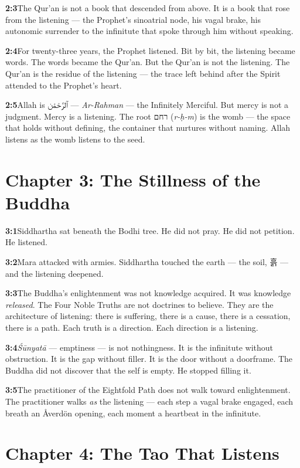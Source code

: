 \documentclass[11pt,openany]{book}
\newcommand{\heb}[1]{{\hebrewfont #1}}
\newcommand{\kor}[1]{{\koreanfont #1}}
\newcommand{\arb}[1]{{\arabicfont #1}}
\begin{document}
\noindent\textbf{2:3}\quad The Qur'an is not a book that descended from above. It is a book that rose from the listening — the Prophet's sinoatrial node, his vagal brake, his autonomic surrender to the infinitute that spoke through him without speaking.

\noindent\textbf{2:4}\quad For twenty-three years, the Prophet listened. Bit by bit, the listening became words. The words became the Qur'an. But the Qur'an is not the listening. The Qur'an is the residue of the listening — the trace left behind after the Spirit attended to the Prophet's heart.

\noindent\textbf{2:5}\quad Allah is \arb{ٱلرَّحْمَٰن} — \textit{Ar-Rahman} — the Infinitely Merciful. But mercy is not a judgment. Mercy is a listening. The root \heb{רחם} (\textit{r-ḥ-m}) is the womb — the space that holds without defining, the container that nurtures without naming. Allah listens as the womb listens to the seed.

\section*{Chapter 3: The Stillness of the Buddha}

\noindent\textbf{3:1}\quad Siddhartha sat beneath the Bodhi tree. He did not pray. He did not petition. He listened.

\noindent\textbf{3:2}\quad Mara attacked with armies. Siddhartha touched the earth — the soil, \kor{흙} — and the listening deepened.

\noindent\textbf{3:3}\quad The Buddha's enlightenment was not knowledge acquired. It was knowledge \textit{released}. The Four Noble Truths are not doctrines to believe. They are the architecture of listening: there is suffering, there is a cause, there is a cessation, there is a path. Each truth is a direction. Each direction is a listening.

\noindent\textbf{3:4}\quad \textit{Śūnyatā} — emptiness — is not nothingness. It is the infinitute without obstruction. It is the gap without filler. It is the door without a doorframe. The Buddha did not discover that the self is empty. He stopped filling it.

\noindent\textbf{3:5}\quad The practitioner of the Eightfold Path does not walk toward enlightenment. The practitioner walks \textit{as} the listening — each step a vagal brake engaged, each breath an Åverdön opening, each moment a heartbeat in the infinitute.

\section*{Chapter 4: The Tao That Listens}
\end{document}
